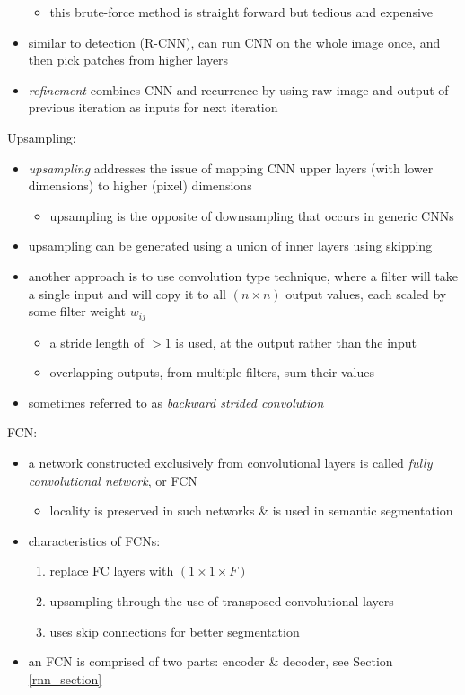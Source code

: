 \documentclass[onecolumn]{IEEEtran}
\newcommand{\bi}{\begin{itemize}}
\newcommand{\ei}{\end{itemize}}
\begin{document}
\begin{itemize}
        \bi
            \item this brute-force method is straight forward but tedious and expensive
        \ei
        \item similar to detection (R-CNN), can run CNN on the whole image once, and then pick patches from higher layers
        \item \emph{refinement} combines CNN and recurrence by using raw image and output of previous iteration as inputs for next iteration
    \ei
    \item Upsampling:
    \bi
        \item \emph{upsampling} addresses the issue of mapping CNN upper layers (with lower dimensions) to higher (pixel) dimensions
        \bi
            \item upsampling is the opposite of downsampling that occurs in generic CNNs
        \ei
        \item upsampling can be generated using a union of inner layers using skipping
        \item another approach is to use convolution type technique, where a filter will take a single input and will copy it to all $(n \times n)$ output values, each scaled by some filter weight $w_{ij}$
        \bi
            \item a stride length of $>1$ is used, at the output rather than the input
            \item overlapping outputs, from multiple filters, sum their values
        \ei
        \item sometimes referred to as \emph{backward strided convolution}
    \ei
    \item FCN:
    \bi
        \item a network constructed exclusively from convolutional layers is called \emph{fully convolutional network}, or FCN
        \bi
            \item locality is preserved in such networks \& is used in semantic segmentation
        \ei
        \item characteristics of FCNs:
        \begin{enumerate}
            \item replace FC layers with $(1 \times 1 \times F)$
            \item upsampling through the use of transposed convolutional layers
            \item uses skip connections for better segmentation
        \end{enumerate}
        \item an FCN is comprised of two parts: encoder \& decoder, see Section \ref{rnn_section}

\end{itemize}
\end{document}
